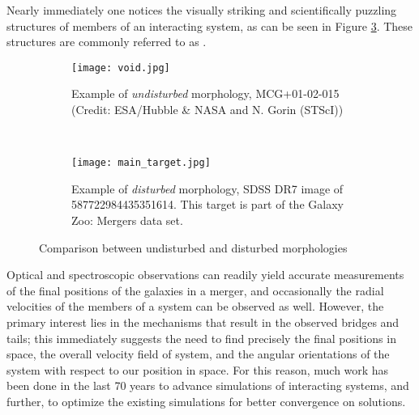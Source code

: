Nearly immediately one notices the visually striking and
scientifically puzzling structures of members of an interacting system, as can
be seen in Figure \ref{fig: main}.
These structures are commonly referred to as 
\cite{Toomre1972}.

\begin{figure}[t!]
    \begin{subfigure}[t]{0.5\textwidth}
        \centering
        \texttt{[image: void.jpg]}
        \caption{Example of \textit{undisturbed} morphology, MCG+01-02-015
    (Credit: ESA/Hubble \& NASA and N. Gorin (STScI))}
    \label{subfig: void}
\end{subfigure}%
~
\begin{subfigure}[t]{0.5\textwidth}
    \centering
    \texttt{[image: main\_target.jpg]}
    \caption{Example of \textit{disturbed} morphology, SDSS DR7 image of
587722984435351614. This target is part of the Galaxy Zoo: Mergers data set.}
\label{subfig: main}
    \end{subfigure}
    \caption[Comparison between undisturbed and disturbed
    morphologies]{Comparison between undisturbed and disturbed morphologies}
    \label{fig: main}
\end{figure}

Optical and spectroscopic observations can readily yield accurate measurements
of the final positions of the galaxies in a merger, and occasionally the radial
velocities of the members of a system can be observed as well. However,
the primary interest
lies in the mechanisms that result in the observed bridges and tails; this
immediately suggests the need to find precisely the final positions in space,
the overall velocity field of system, and the angular orientations of the system
with respect to our position in space. For this reason, much work has been done
in the last 70 years to advance simulations of interacting systems, and further,
to optimize the existing simulations for better convergence on solutions.


